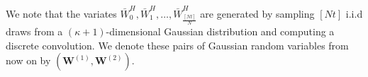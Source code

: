 We note that the variates $\bar{W}_0^{H},\bar{W}_1^{H},\dots,\bar{W}_{\frac{[Nt]}{N}}^{H}$ are  generated by sampling $[Nt]$ i.i.d draws from a $(\kappa+1)$-dimensional Gaussian distribution and computing a discrete convolution. We denote these pairs  of Gaussian random variables from now on by $(\mathbf{W}^{(1)},\mathbf{W}^{(2)})$. 
